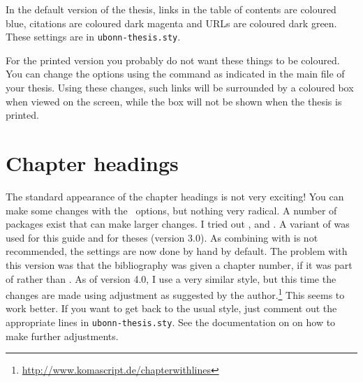 In the default version of the thesis, links in the table of contents
are coloured blue, citations are coloured dark magenta and URLs are
coloured dark green. These settings are in \texttt{ubonn-thesis.sty}.

For the printed version you probably do not want these things to be
coloured. You can change the  options using the
 command as indicated in the main file of your
thesis. Using these changes, such links will be surrounded by a
coloured box when viewed on the screen, while the box will not be shown when the thesis
is printed.


\section{Chapter headings}%
\label{sec:layout:chapter}

The standard appearance of the chapter headings is not very exciting!
You can make some changes with the \KOMAScript\ options, but nothing
very radical.
A number of packages exist that can make larger changes. 
I tried out ,  and .
A variant of  was used for this guide and for theses (version 3.0).
As combining  with \KOMAScript{} is not recommended,
the settings are now done by hand by default.
The problem with this version was that the bibliography was given a chapter number,
if it was part of  rather than .
As of version 4.0, I use a very similar style,
but this time the changes are made using \KOMAScript{} adjustment as suggested by the author.\footnote{%
\url{http://www.komascript.de/chapterwithlines}}
This seems to work better.
If you want to get back to the
usual style, just comment out the appropriate lines in
\texttt{ubonn-thesis.sty}. See the documentation on
 on how to make further adjustments.

